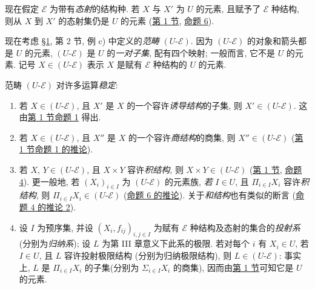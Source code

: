 现在\pageoriginale 假定 $\mathcal{E}$ 为带有\emph{态射}的结构种. 若 $X$ 与 $X'$ 为 $U$ 的元素, 且赋予了 $\mathcal{E}$ 种结构, 则从 $X$ 到 $X'$ 的态射集仍是 $U$ 的元素 (\hyperlink{sga4.exp.I.appendix.II.sec.1}{第 1 节}, \hyperlink{sga4.exp.I.appendix.II.sec.1.proposition.6}{命题 6}).

现在考虑 \hyperlink{sga4.exp.I.appendix.II.sec.1}{\S 1}, 第 2 节, 例 c) 中定义的\emph{范畴} $(U\text{-}\mathcal{E})$. 因为 $(U\text{-}\mathcal{E})$ 的对象和箭头都是 $U$ 的元素, $(U\text{-}\mathcal{E})$ 是 $U$ 的\emph{一对子集}, 配有四个映射; 一般而言, 它不是 $U$ 的元素. 记号 $X\in (U\text{-}\mathcal{E})$ 表示 $X$ 是赋有 $\mathcal{E}$ 种结构的 $U$ 的元素.

范畴 $(U\text{-}\mathcal{E})$ 对许多运算\emph{稳定}:

\begin{enumerate}
\renewcommand{\theenumi}{\alph{enumi}}
\renewcommand{\labelenumi}{\theenumi)}
\item 若 $X\in(U\text{-}\mathcal{E})$, 且 $X'$ 是 $X$ 的一个容许\emph{诱导结构}的子集, 则 $X'\in(U\text{-}\mathcal{E})$. 这由\hyperlink{sga4.exp.I.appendix.II.sec.1}{第 1 节}\hyperlink{sga4.exp.I.appendix.II.sec.1.proposition.1}{命题 1} 得出.

\item 若 $X\in (U\text{-}\mathcal{E})$, 且 $X''$ 是 $X$ 的一个容许\emph{商结构}的商集, 则 $X''\in(U\text{-}\mathcal{E})$ (\hyperlink{sga4.exp.I.appendix.II.sec.1}{第 1 节}\hyperlink{sga4.exp.I.appendix.II.sec.1.corollary.to.proposition.1}{命题 1 的推论}).

\item 若 $X$, $Y\in (U\text{-}\mathcal{E})$, 且 $X\times Y$ 容许\emph{积结构}, 则 $X\times Y\in(U\text{-}\mathcal{E})$ (\hyperlink{sga4.exp.I.appendix.II.sec.1}{第 1 节}, \hyperlink{sga4.exp.I.appendix.II.sec.1.proposition.4}{命题 4}). 更一般地, 若 $(X_i)_{i\in I}$ 为 $(U\text{-}\mathcal{E})$ 的元素族, \emph{若} $I\in U$, 且 $\Pi_{i\in I}X_i$ 容许\emph{积结构}, 则 $\Pi_{i\in I}X_i\in (U\text{-}\mathcal{E})$ (\hyperlink{sga4.exp.I.appendix.II.sec.1.corollary.to.proposition.6}{命题 6 的推论}). 关于\emph{和结构}也有类似的断言 (\hyperlink{sga4.exp.I.appendix.II.sec.1.corollary.to.proposition.4.2}{命题 4 的推论 2}).

\item 设 $I$ 为预序集, 并设 $(X_i, f_{ij})_{i,j\in I}$ 为赋有 $\mathcal{E}$ 种结构及态射的集合的\emph{投射系} (分别为\emph{归纳系}); 设 $L$ 为第 III 章意义下此系的极限. 若对每个 $i$ 有 $X_i\in U$, 若 $I\in U$, 且 $L$ 容许投射极限结构 (分别为归纳极限结构), 则 $L\in (U\text{-}\mathcal{E})$: 事实上, $L$ 是 $\Pi_{i\in I}X_i$ 的子集\pageoriginale (分别为 $\Sigma_{i\in I}X_i$ 的商集), 因而由\hyperlink{sga4.exp.I.appendix.II.sec.1}{第 1 节}可知它是 $U$ 的元素.
\end{enumerate}

